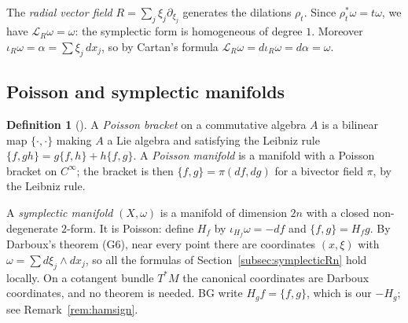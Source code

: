 \documentclass[11pt,oneside,reqno]{article}
\newcommand{\CI}{C^\infty}
\newcommand{\Lie}{\mathcal L}
\newcommand{\pa}{\partial}
\theoremstyle{plain}
\theoremstyle{definition}
\newtheorem{definition}[theorem]{Definition}
\theoremstyle{remark}
\begin{document}
The \emph{radial vector field} \(R=\sum_j\xi_j\pa_{\xi_j}\) generates the dilations
\(\rho_t\). Since \(\rho_t^*\omega=t\omega\), we have \(\Lie_R\omega=\omega\): the
symplectic form is homogeneous of degree \(1\). Moreover \(\iota_R\omega=
\alpha=\sum\xi_j\,dx_j\), so by Cartan's formula \(\Lie_R\omega=d\iota_R\omega=d\alpha=\omega\).

\subsection{Poisson and symplectic manifolds}\label{subsec:poissondef}
\begin{definition}[{\cite[\S1]{BG}}]
A \emph{Poisson bracket} on a commutative algebra \(A\) is a bilinear map
\(\{\cdot,\cdot\}\) making \(A\) a Lie algebra and satisfying the Leibniz rule
\(\{f,gh\}=g\{f,h\}+h\{f,g\}\). A \emph{Poisson manifold} is a manifold with a
Poisson bracket on \(\CI\); the bracket is then \(\{f,g\}=\pi(df,dg)\) for a
bivector field \(\pi\), by the Leibniz rule.
\end{definition}

A \emph{symplectic manifold} \((X,\omega)\) is a manifold of dimension \(2n\)
with a closed non-degenerate \(2\)-form. It is Poisson: define \(H_f\) by
\(\iota_{H_f}\omega=-df\) and \(\{f,g\}=H_fg\). By Darboux's theorem (G6), near
every point there are coordinates \((x,\xi)\) with \(\omega=\sum d\xi_j\wedge dx_j\),
so all the formulas of Section~\ref{subsec:symplecticRn} hold locally. On a
cotangent bundle \(T^*M\) the canonical coordinates are Darboux coordinates,
and no theorem is needed. BG write \(H_gf=\{f,g\}\), which is our \(-H_g\);
see Remark~\ref{rem:hamsign}.
\end{document}
